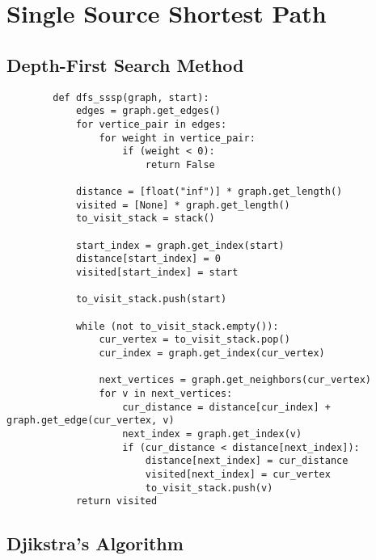 \newpage

\section[Day 7: Single Source Shortest Path]{ Single Source Shortest Path }

\subsection{ Depth-First Search Method }

    \begin{lstlisting}
        def dfs_sssp(graph, start):
            edges = graph.get_edges()
            for vertice_pair in edges:
                for weight in vertice_pair:
                    if (weight < 0):
                        return False
                    
            distance = [float("inf")] * graph.get_length()
            visited = [None] * graph.get_length()
            to_visit_stack = stack()

            start_index = graph.get_index(start)
            distance[start_index] = 0
            visited[start_index] = start
            
            to_visit_stack.push(start)
            
            while (not to_visit_stack.empty()):
                cur_vertex = to_visit_stack.pop()
                cur_index = graph.get_index(cur_vertex)
                
                next_vertices = graph.get_neighbors(cur_vertex)
                for v in next_vertices:
                    cur_distance = distance[cur_index] + graph.get_edge(cur_vertex, v)
                    next_index = graph.get_index(v)
                    if (cur_distance < distance[next_index]):
                        distance[next_index] = cur_distance
                        visited[next_index] = cur_vertex
                        to_visit_stack.push(v)
            return visited
    \end{lstlisting}

    \newpage





\subsection{ Djikstra's Algorithm }

